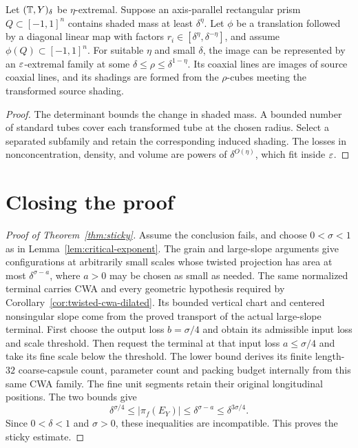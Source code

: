 \begin{lemma}
\label{lem:mild-rescaling}
Let $(\mathbb{T},Y)_\delta$ be $\eta$-extremal. Suppose an axis-parallel
rectangular prism $Q\subset[-1,1]^n$ contains shaded mass at least
$\delta^\eta$. Let $\phi$ be a translation followed by a diagonal
linear map with factors $r_i\in[\delta^\eta,\delta^{-\eta}]$, and
assume $\phi(Q)\subset[-1,1]^n$. For suitable $\eta$ and small
$\delta$, the image can be represented by an $\varepsilon$-extremal family
at some $\delta\leq\rho\leq\delta^{1-\eta}$. Its coaxial lines are
images of source coaxial lines, and its shadings are formed from the
$\rho$-cubes meeting the transformed source shading.
\end{lemma}
\begin{proof}
The determinant bounds the change in shaded mass. A bounded number
of standard tubes cover each transformed tube at the chosen radius.
Select a separated subfamily and retain the corresponding induced
shading. The losses in nonconcentration, density, and volume are powers
of $\delta^{O(\eta)}$, which fit inside $\varepsilon$.
\end{proof}

\section{Closing the proof}

\begin{proof}[Proof of Theorem~\ref{thm:sticky}]
\leanok
Assume the conclusion fails, and choose $0<\sigma<1$ as in
Lemma~\ref{lem:critical-exponent}. The grain and large-slope arguments
give configurations at arbitrarily small scales whose twisted
projection has area at most $\delta^{\sigma-a}$, where $a>0$ may be
chosen as small as needed. The same normalized terminal carries CWA
and every geometric hypothesis required by
Corollary~\ref{cor:twisted-cwa-dilated}. Its bounded vertical chart and
centered nonsingular slope come from the proved transport of the actual
large-slope terminal. First choose the output loss
$b=\sigma/4$ and obtain its admissible input loss and scale threshold.
Then request the terminal at that input loss $a\leq\sigma/4$
and take its fine scale below the threshold. The lower bound derives
its finite length-$32$ coarse-capsule count, parameter count and packing
budget internally from this same CWA family. The fine unit segments
retain their original longitudinal positions.
The two bounds give
\[
 \delta^{\sigma/4}\leq |\pi_f(E_Y)|
       \leq\delta^{\sigma-a}\leq\delta^{3\sigma/4}.
\]
Since $0<\delta<1$ and $\sigma>0$, these inequalities are
incompatible. This proves the sticky estimate.
\end{proof}
